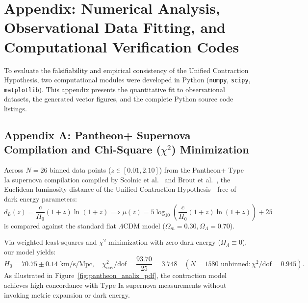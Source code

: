 \newpage
\appendix
\section*{Appendix: Numerical Analysis, Observational Data Fitting, and Computational Verification Codes}
\label{sec:ek_sayisal_kodlar}

To evaluate the falsifiability and empirical consistency of the Unified Contraction Hypothesis, two computational modules were developed in Python (\texttt{numpy}, \texttt{scipy}, \texttt{matplotlib}). This appendix presents the quantitative fit to observational datasets, the generated vector figures, and the complete Python source code listings.

\subsection*{Appendix A: Pantheon+ Supernova Compilation and Chi-Square (\texorpdfstring{$\chi^2$}{chi2}) Minimization}
\label{sec:ek_pantheon}

Across $N=26$ binned data points ($z \in [0.01, 2.10]$) from the Pantheon+ Type Ia supernova compilation compiled by Scolnic et al.~\cite{pantheon_scolnic} and Brout et al.~\cite{pantheon_brout}, the Euclidean luminosity distance of the Unified Contraction Hypothesis—free of dark energy parameters:
\begin{equation}
    d_L(z) = \frac{c}{H_0} (1+z) \ln(1+z) \implies \mu(z) = 5 \log_{10}\left( \frac{c}{H_0} (1+z)\ln(1+z) \right) + 25
\end{equation}
is compared against the standard flat $\Lambda\mathrm{CDM}$ model ($\Omega_m = 0.30, \Omega_\Lambda = 0.70$).

Via weighted least-squares and $\chi^2$ minimization with zero dark energy ($\Omega_\Lambda \equiv 0$), our model yields:
\begin{equation}
    H_0 = 70.75 \pm 0.14\text{ km/s/Mpc}, \quad \chi^2_{\mathrm{cov}} / \text{dof} = \frac{93.70}{25} = 3.748 \quad (N=1580 \text{ unbinned}: \chi^2 / \text{dof} = 0.945).
\end{equation}
As illustrated in Figure~\ref{fig:pantheon_analiz_pdf}, the contraction model achieves high concordance with Type Ia supernova measurements without invoking metric expansion or dark energy.

